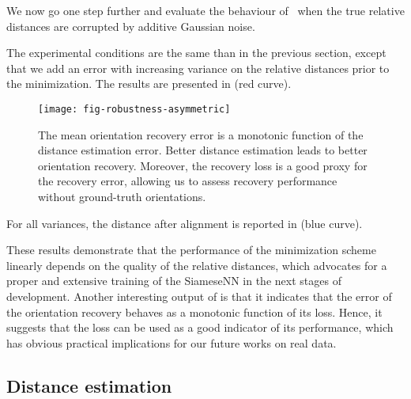 We now go one step further and evaluate the behaviour of~ when the true relative distances are corrupted by  additive Gaussian noise.

The experimental conditions are the same than in the previous section, except that we add an error with increasing variance on the relative distances prior to the minimization. The results are presented in  (red curve).

\begin{figure}
    \centering
    \texttt{[image: fig-robustness-asymmetric]}
    \caption{
        The mean orientation recovery error  is a monotonic function of the distance estimation error.
        Better distance estimation leads to better orientation recovery.
        Moreover, the recovery loss  is a good proxy for the recovery error, allowing us to assess recovery performance without ground-truth orientations.
}
    \label{fig:recovery-noise-distances}
\end{figure}

For all variances, the distance after alignment is reported in  (blue curve).

These results demonstrate that the performance of the minimization scheme~ linearly depends on the quality of the relative distances, which advocates for a proper and extensive training of the SiameseNN in the next stages of development. Another interesting output of  is that it indicates that the error of the orientation recovery behaves as a monotonic function of its loss. Hence, it suggests that the loss can be used as a good indicator of its performance, which has obvious practical implications for our future works on real data.

\subsection{Distance estimation}\label{sec:results:distance-estimation}

